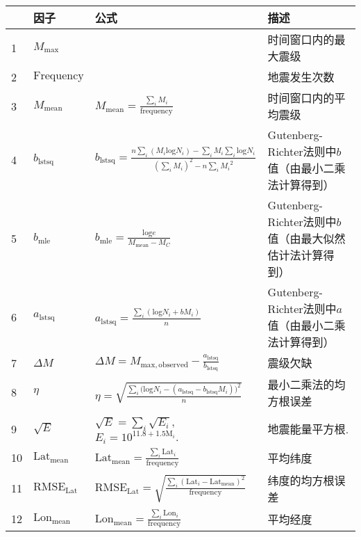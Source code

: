 \begin{sidewaystable}[htpb]
  \centering
  \label{tab:seism_input_data}
  \footnotesize
  \renewcommand{\arraystretch}{1}
  \begin{tabular}{llll}
  \toprule
   & 因子 & 公式 & 描述 \\
  \midrule
  1 & $M_{\mathrm{max}}$ &  & 时间窗口内的最大震级 \\ 
  2 & $\mathrm{Frequency}$ &  & 地震发生次数 \\ 
  3 & $M_{\mathrm{mean}}$ & $\displaystyle M_{\mathrm{mean}}=\frac{\sum_i{M_i}}{\mathrm{frequency}}$ & 时间窗口内的平均震级 \\ 
  4 & $b_{\mathrm{lstsq}}$ & $\displaystyle b_{\mathrm{lstsq}}=\frac{n\sum_i{(M_i\mathrm{log} N_i)}-\sum_i{M_i}\sum_i\mathrm{log}N_i}{(\sum_i{M_i})^2-n\sum_i{{M_i}^2}}$ & Gutenberg-Richter法则中$b$值（由最小二乘法计算得到） \\
  5 & $b_{\mathrm{mle}}$ & $\displaystyle b_{\mathrm{mle}}=\frac{\mathrm{log}e}{M_{\mathrm{mean}}-M_C}$ & Gutenberg-Richter法则中$b$值（由最大似然估计法计算得到） \\ 
  6 & $a_{\mathrm{lstsq}}$ & $\displaystyle a_{\mathrm{lstsq}}=\frac{\sum_i{(\mathrm{log}N_i+bM_i)}}{n}$ & Gutenberg-Richter法则中$a$值（由最小二乘法计算得到） \\ 
  7 & $\Delta M$ & $\displaystyle \Delta M=M_{\mathrm{max, observed}}- \frac{a_{\mathrm{lstsq}}}{b_{\mathrm{lstsq}}}$ & 震级欠缺 \\ 
  8 & $\eta$ & $\displaystyle \eta=\sqrt{\frac{\sum_i{(\mathrm{log} {N_i}}-(a_{\mathrm{lstsq}}-b_{\mathrm{lstsq}}{M_i}))^2}{n}}$ & 最小二乘法的均方根误差 \\ 
  9 & $\sqrt{E}$ & $\displaystyle \sqrt{E}=\sum_i{\sqrt{E_i}}$, $\displaystyle E_i=10^{11.8+1.5\mathrm{M}_i}.$ & 地震能量平方根\citep{Last2016predicting,asim2017earthquake}.
  \\ 
  10 & $\mathrm{Lat}_{\mathrm{mean}}$ & $\displaystyle \mathrm{Lat}_{\mathrm{mean}}=\frac{\sum_i{\mathrm{Lat}_i}}{\mathrm{frequency}}$ & 平均纬度 \\ 
  11 & $\mathrm{RMSE}_{\mathrm{Lat}}$ & $\displaystyle \mathrm{RMSE}_{\mathrm{Lat}}=\sqrt{\frac{\sum_i{(\mathrm{Lat}_i-\mathrm{Lat}_\mathrm{mean})}^2}{\mathrm{frequency}}}$ & 纬度的均方根误差 \\ 
  12 & $\mathrm{Lon}_{\mathrm{mean}}$ & $\displaystyle \mathrm{Lon}_{\mathrm{mean}}=\frac{\sum_i{\mathrm{Lon}_i}}{\mathrm{frequency}}$ & 平均经度\\ 

\end{tabular}
\end{sidewaystable}
